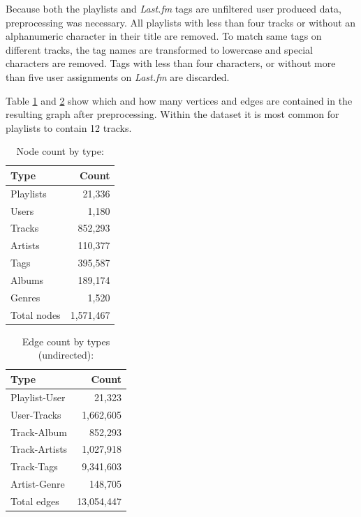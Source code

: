 \documentclass[sigconf]{acmart}
\begin{document}
Because both the playlists and \emph{Last.fm} tags are unfiltered user produced data, preprocessing was necessary. All playlists with less than four tracks or without an alphanumeric character in their title are removed. To match same tags on different tracks, the tag names are transformed to lowercase and special characters are removed. Tags with less than four characters, or without more than five user assignments on \emph{Last.fm} are discarded.

Table \ref{table:node_count} and \ref{table:edge_count} show which and how many vertices and edges are contained in the resulting graph after preprocessing. Within the dataset it is most common for playlists to contain 12 tracks.

\begin{table}[H]
	\caption{Node count by type:}
	\label{table:node_count}
	\begin{tabular}{lr}
		\midrule 
		\textbf{Type} & \textbf{Count} \\ 
		\midrule 
		Playlists & 21,336  \\
		Users     & 1,180     \\
		Tracks    & 852,293 \\
		Artists   & 110,377  \\
		Tags      & 395,587    \\
		Albums    & 189,174    \\
		Genres	  & 1,520	\\
		\midrule 
		Total nodes & 1,571,467\\
		\bottomrule
	\end{tabular}
\end{table}

\begin{table}[H]
	\caption{Edge count by types (undirected):}
	\label{table:edge_count}
	\begin{tabular}{lr}
		\midrule 
		\textbf{Type} & \textbf{Count} \\ 
		\midrule 
		Playlist-User   & 21,323  \\
		User-Tracks     & 1,662,605     \\
		Track-Album		& 852,293 \\
		Track-Artists   & 1,027,918 \\
		Track-Tags   	& 9,341,603 \\
		Artist-Genre	& 148,705  \\
		\midrule 
		Total edges 	& 13,054,447\\
		\bottomrule
	\end{tabular}
\end{table}
\end{document}
